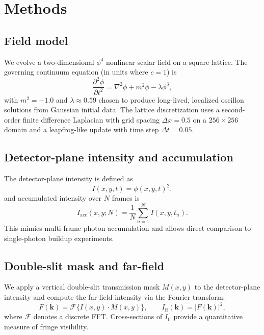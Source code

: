\section{Methods}
\subsection{Field model}
We evolve a two-dimensional $\phi^4$ nonlinear scalar field on a square lattice. The governing continuum equation (in units where $c=1$) is
\begin{equation}
\frac{\partial^2 \phi}{\partial t^2} = \nabla^2 \phi + m^2 \phi - \lambda \phi^3,
\label{eq:phi4}
\end{equation}
with $m^2=-1.0$ and $\lambda\approx 0.59$ chosen to produce long-lived, localized oscillon solutions from Gaussian initial data. The lattice discretization uses a second-order finite difference Laplacian with grid spacing $\Delta x = 0.5$ on a $256\times256$ domain and a leapfrog-like update with time step $\Delta t = 0.05$.

\subsection{Detector-plane intensity and accumulation}
The detector-plane intensity is defined as
\begin{equation}
I(x,y,t) = \phi(x,y,t)^2,
\end{equation}
and accumulated intensity over $N$ frames is
\begin{equation}
I_{\mathrm{acc}}(x,y;N) = \frac{1}{N}\sum_{n=1}^{N} I(x,y,t_n).
\end{equation}
This mimics multi-frame photon accumulation and allows direct comparison to single-photon buildup experiments.

\subsection{Double-slit mask and far-field}
We apply a vertical double-slit transmission mask $M(x,y)$ to the detector-plane intensity and compute the far-field intensity via the Fourier transform:
\begin{equation}
F(\mathbf{k}) = \mathcal{F}\{I(x,y)\cdot M(x,y)\},\qquad I_{\mathrm{ff}}(\mathbf{k})=|F(\mathbf{k})|^2,
\end{equation}
where $\mathcal{F}$ denotes a discrete FFT. Cross-sections of $I_{\mathrm{ff}}$ provide a quantitative measure of fringe visibility.

